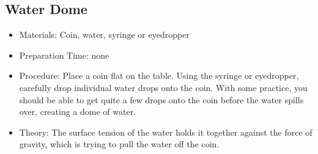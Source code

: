 %
%
%


\subsection{Water Dome}
\begin{itemize}
\item{Materials: Coin, water, syringe or eyedropper}
\item{Preparation Time: none}
\item{Procedure: Place a coin flat on the table. Using the syringe or eyedropper, carefully drop individual water drops onto the coin. With some practice, you should be able to get quite a few drops onto the coin before the water spills over, creating a dome of water.}
\item{Theory: The surface tension of the water holds it together against the force of gravity, which is trying to pull the water off the coin.}
\end{itemize}


